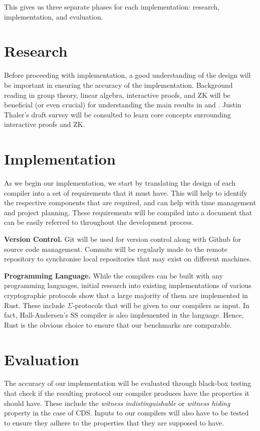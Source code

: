 \documentclass[a4paper,fleqn,12pt]{article}
\begin{document}
This gives us three separate phases for each implementation: research, implementation, and evaluation.

\section{Research}
Before proceeding with implementation, a good understanding of the design will be important in ensuring the accuracy of the implementation. Background reading in group theory, linear algebra, interactive proofs, and ZK will be beneficial (or even crucial) for understanding the main results in \cite{CDS94} and \cite{StackingSigmas}. Justin Thaler's draft survey \cite{PAZK} will be consulted to learn core concepts surrounding interactive proofs and ZK. 

\section{Implementation}
As we begin our implementation, we start by translating the design of each compiler into a set of requirements that it must have. This will help to identify the respective components that are required, and can help with time management and project planning. These requirements will be compiled into a document that can be easily referred to throughout the development process. 

\textbf{Version Control.} Git will be used for version control along with Github for source code management. Commits will be regularly made to the remote repository to synchronise local repositories that may exist on different machines. 

\textbf{Programming Language.} While the compilers can be built with any programming languages, initial research into existing implementations of various cryptographic protocols show that a large majority of them are implemented in Rust. These include $\Sigma$-protocols that will be given to our compilers as input. In fact, Hall-Andersen's SS compiler is also implemented in the language. Hence, Rust is the obvious choice to ensure that our benchmarks are comparable. 

\section{Evaluation}
The accuracy of our implementation will be evaluated through black-box testing that check if the resulting protocol our compiler produces have the properties it should have. These include the \textit{witness indistinguishable} or \textit{witness hiding} property in the case of CDS. Inputs to our compilers will also have to be tested to ensure they adhere to the properties that they are supposed to have. 
\end{document}
